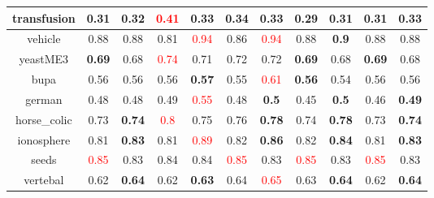 \documentclass{article}%
\begin{document}
\begin{tabular}{c|cccccccccc}
\hline%
transfusion&0.31&\textbf{0.32}&\textcolor{red}{ 
0.41
}&0.33&\textbf{0.34}&0.33&0.29&\textbf{0.31}&0.31&\textbf{0.33}\\%
\hline%
vehicle&0.88&0.88&0.81&\textcolor{red}{ 
0.94
}&0.86&\textcolor{red}{ 
0.94
}&0.88&\textbf{0.9}&0.88&0.88\\%
\hline%
yeastME3&\textbf{0.69}&0.68&\textcolor{red}{ 
0.74
}&0.71&0.72&0.72&\textbf{0.69}&0.68&\textbf{0.69}&0.68\\%
\hline%
bupa&0.56&0.56&0.56&\textbf{0.57}&0.55&\textcolor{red}{ 
0.61
}&\textbf{0.56}&0.54&0.56&0.56\\%
\hline%
german&0.48&0.48&0.49&\textcolor{red}{ 
0.55
}&0.48&\textbf{0.5}&0.45&\textbf{0.5}&0.46&\textbf{0.49}\\%
\hline%
horse\_colic&0.73&\textbf{0.74}&\textcolor{red}{ 
0.8
}&0.75&0.76&\textbf{0.78}&0.74&\textbf{0.78}&0.73&\textbf{0.74}\\%
\hline%
ionosphere&0.81&\textbf{0.83}&0.81&\textcolor{red}{ 
0.89
}&0.82&\textbf{0.86}&0.82&\textbf{0.84}&0.81&\textbf{0.83}\\%
\hline%
seeds&\textcolor{red}{ 
0.85
}&0.83&0.84&0.84&\textcolor{red}{ 
0.85
}&0.83&\textcolor{red}{ 
0.85
}&0.83&\textcolor{red}{ 
0.85
}&0.83\\%
\hline%
vertebal&0.62&\textbf{0.64}&0.62&\textbf{0.63}&0.64&\textcolor{red}{ 
0.65
}&0.63&\textbf{0.64}&0.62&\textbf{0.64}\\%
\hline%
\end{tabular}

%
\end{document}
